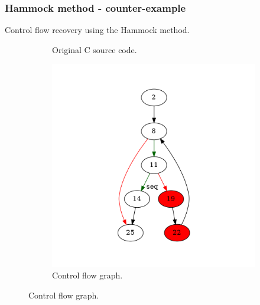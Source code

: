\documentclass[aspectratio=1610]{beamer}
\begin{document}
\begin{frame}
	\frametitle{Hammock method - counter-example}
	Control flow recovery using the Hammock method.
	\begin{figure}[htbp]
		\centering
		\begin{subfigure}[b]{0.30\textwidth}
			\centering
			
			\caption{Original C source code.}
		\end{subfigure}
		\begin{subfigure}[b]{0.50\textwidth}
			\centering
			\includegraphics[height=0.6\paperheight]{inc/methods/hammock/counter-example/with-break/main_0001a.png}
			\caption{Control flow graph.}
		\end{subfigure}
	\end{figure}
\end{frame}
\end{document}
